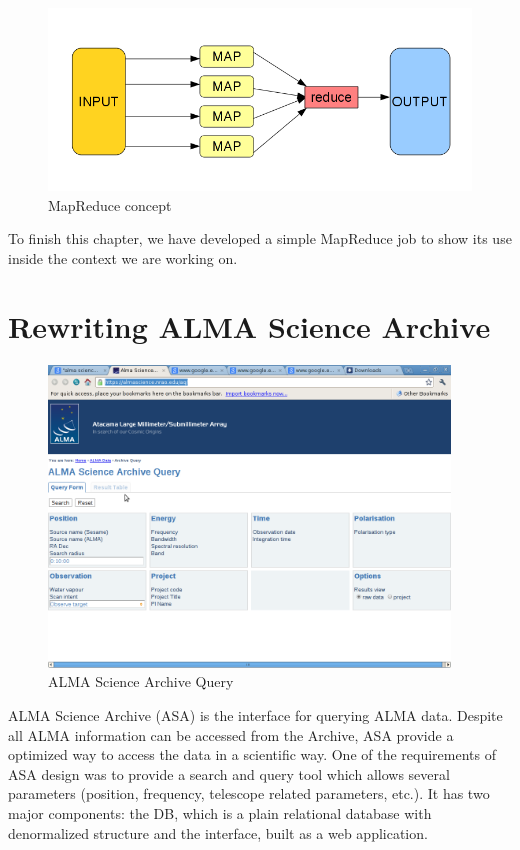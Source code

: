 \begin{figure}[tb]
\centering
\includegraphics[width=\textwidth]{images/map_reduce_chart.png}
\caption{MapReduce concept}
\end{figure}

To finish this chapter, we have developed a simple MapReduce job to show its use inside the context we are working on.




\section{Rewriting ALMA Science Archive}

\begin{figure}
\centering
\includegraphics[height=8cm]{images/aq.png}
\caption{ALMA Science Archive Query}
\end{figure}


ALMA Science Archive (ASA) is the interface for querying ALMA data. Despite all ALMA information can be accessed from the Archive, ASA provide a optimized way to access the data in a scientific way. One of the requirements of ASA design was to provide a search and query tool which allows several parameters (position, frequency, telescope related parameters, etc.). It has two major components: the DB, which is a plain relational database with denormalized structure and the interface, built as a web application.


